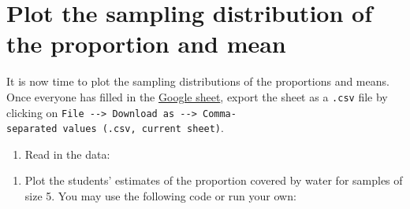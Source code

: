 \documentclass[letterpaper,12pt,twoside,]{pinp}
\providecommand{\tightlist}{%
  \setlength{\itemsep}{0pt}\setlength{\parskip}{0pt}}
\begin{document}
\hypertarget{plot-the-sampling-distribution-of-the-proportion-and-mean}{%
\section{Plot the sampling distribution of the proportion and
mean}\label{plot-the-sampling-distribution-of-the-proportion-and-mean}}

It is now time to plot the sampling distributions of the proportions and
means. Once everyone has filled in the
\href{https://docs.google.com/spreadsheets/d/1Mnxeq9nQcTdQycZ7S_62fYFiNC5_a3fibsyodzfwO58/edit?usp=sharing}{Google
sheet}, export the sheet as a \texttt{.csv} file by clicking on
\texttt{File\ -\/-\textgreater{}\ Download\ as\ -\/-\textgreater{}\ Comma-separated\ values\ (.csv,\ current\ sheet)}.

\begin{enumerate}
\def\labelenumi{\arabic{enumi}.}
\tightlist
\item
  Read in the data:
\end{enumerate}

\begin{Shaded}
\begin{Highlighting}[]
\StringTok{ }\NormalTok{(}\NormalTok{, }\NormalTok{)}
\StringTok{ }\NormalTok{water_results[,}\OperatorTok{:}\NormalTok{]}
\StringTok{ }\NormalTok{water_results[}\NormalTok{(water_results), ]}

\StringTok{ }
\end{Highlighting}
\end{Shaded}

\begin{enumerate}
\def\labelenumi{\arabic{enumi}.}
\setcounter{enumi}{1}
\tightlist
\item
  Plot the students' estimates of the proportion covered by water for
  samples of size 5. You may use the following code or run your own:
\end{enumerate}

\begin{Shaded}
\begin{Highlighting}[]
\NormalTok{(}\NormalTok{(water_results[,}\NormalTok{]), }
      \NormalTok{(}\NormalTok{,}\NormalTok{),}
      \NormalTok{,}
      \NormalTok{, }
      \NormalTok{(}\OperatorTok{/}\NormalTok{), }
      \NormalTok{)}
\end{Highlighting}
\end{Shaded}
\end{document}
